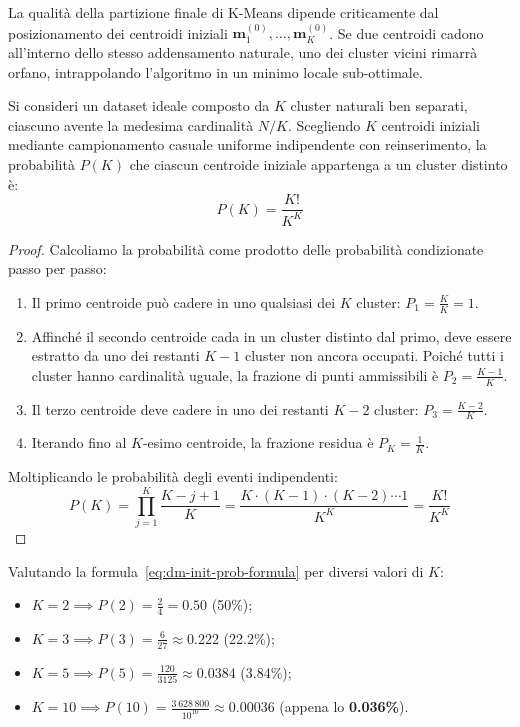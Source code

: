La qualità della partizione finale di K-Means dipende criticamente dal posizionamento dei centroidi iniziali $\mathbf{m}_1^{(0)}, \dots, \mathbf{m}_K^{(0)}$. Se due centroidi cadono all'interno dello stesso addensamento naturale, uno dei cluster vicini rimarrà orfano, intrappolando l'algoritmo in un minimo locale sub-ottimale.

\begin{theorem}
Si consideri un dataset ideale composto da $K$ cluster naturali ben separati, ciascuno avente la medesima cardinalità $N/K$. Scegliendo $K$ centroidi iniziali mediante campionamento casuale uniforme indipendente con reinserimento, la probabilità $P(K)$ che ciascun centroide iniziale appartenga a un cluster distinto è:
\begin{equation}
    P(K) = \frac{K!}{K^K}
    \label{eq:dm-init-prob-formula}
\end{equation}
\end{theorem}

\begin{proof}
Calcoliamo la probabilità come prodotto delle probabilità condizionate passo per passo:
\begin{enumerate}
    \item Il primo centroide può cadere in uno qualsiasi dei $K$ cluster: $P_1 = \frac{K}{K} = 1$.
    \item Affinché il secondo centroide cada in un cluster distinto dal primo, deve essere estratto da uno dei restanti $K-1$ cluster non ancora occupati. Poiché tutti i cluster hanno cardinalità uguale, la frazione di punti ammissibili è $P_2 = \frac{K-1}{K}$.
    \item Il terzo centroide deve cadere in uno dei restanti $K-2$ cluster: $P_3 = \frac{K-2}{K}$.
    \item Iterando fino al $K$-esimo centroide, la frazione residua è $P_K = \frac{1}{K}$.
\end{enumerate}
Moltiplicando le probabilità degli eventi indipendenti:
\begin{equation}
    P(K) = \prod_{j=1}^K \frac{K - j + 1}{K} = \frac{K \cdot (K-1) \cdot (K-2) \cdots 1}{K^K} = \frac{K!}{K^K}
\end{equation}
\end{proof}

Valutando la formula~\eqref{eq:dm-init-prob-formula} per diversi valori di $K$:
\begin{itemize}[noitemsep]
    \item $K = 2 \implies P(2) = \frac{2}{4} = 0.50$ (50\%);
    \item $K = 3 \implies P(3) = \frac{6}{27} \approx 0.222$ (22.2\%);
    \item $K = 5 \implies P(5) = \frac{120}{3125} \approx 0.0384$ (3.84\%);
    \item $K = 10 \implies P(10) = \frac{3\,628\,800}{10^{10}} \approx 0.00036$ (appena lo \textbf{0.036\%}).
\end{itemize}

